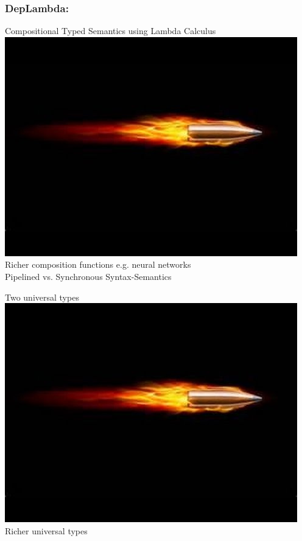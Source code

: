 \documentclass[mathserif,12pt]{beamer}
\begin{document}
\begin{frame}
  \frametitle{DepLambda:  }
\large
Compositional Typed Semantics using Lambda Calculus \\
\pause
\includegraphics[trim=16em 14em 4em 10em,clip=true,scale=0.2]{figures/bullet}\; Richer composition functions e.g. neural networks\\
\hspace{3.7em} Pipelined vs. Synchronous Syntax-Semantics

\vspace{2em}
\pause
Two universal types\\
\pause
\includegraphics[trim=16em 14em 4em 10em,clip=true,scale=0.2]{figures/bullet}\; Richer universal types


\end{frame}
\end{document}
